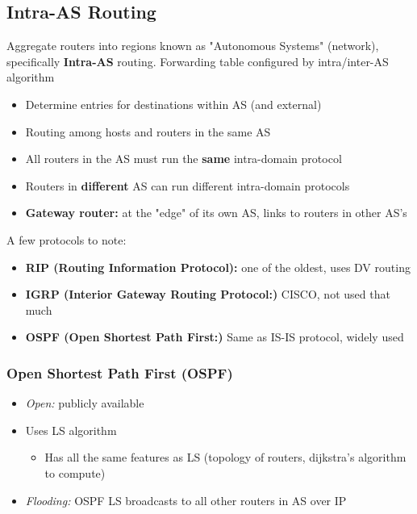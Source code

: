 \documentclass{article}
\begin{document}
\subsection{Intra-AS Routing}
Aggregate routers into regions known as "Autonomous Systems" (network), specifically 
\textbf{Intra-AS} routing. Forwarding table configured by intra/inter-AS algorithm
\begin{itemize}
    \item Determine entries for destinations within AS (and external)
    \item Routing among hosts and routers in the same AS
    \item All routers in the AS must run the \textbf{same} intra-domain protocol
    \item Routers in \textbf{different} AS can run different intra-domain protocols
    \item \textbf{Gateway router:} at the "edge" of its own AS, links to routers in other AS's
\end{itemize}
A few protocols to note:
\begin{itemize}
    \item \textbf{RIP (Routing Information Protocol):} one of the oldest, uses DV routing
    \item \textbf{IGRP (Interior Gateway Routing Protocol:)} CISCO, not used that much
    \item \textbf{OSPF (Open Shortest Path First:)} Same as IS-IS protocol, widely used
\end{itemize}

\subsubsection{Open Shortest Path First (OSPF)}
\begin{itemize}
    \item \textit{Open:} publicly available
    \item Uses LS algorithm
    \begin{itemize}
        \item Has all the same features as LS (topology of routers, dijkstra's algorithm to compute)
    \end{itemize}
    \item \textit{Flooding:} OSPF LS broadcasts to all other routers in AS over IP
\end{itemize}
\newpage

\end{document}
